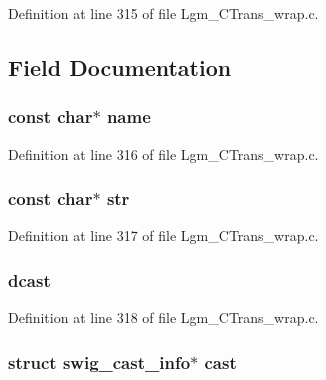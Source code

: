 Definition at line 315 of file Lgm\_\-CTrans\_\-wrap.c.

\subsection{Field Documentation}
\hypertarget{structswig__type__info_8f8f80d37794cde9472343e4487ba3eb}{
\subsubsection[{name}]{\setlength{\rightskip}{0pt plus 5cm}const char$\ast$ {\bf name}}}
\label{structswig__type__info_8f8f80d37794cde9472343e4487ba3eb}




Definition at line 316 of file Lgm\_\-CTrans\_\-wrap.c.\hypertarget{structswig__type__info_f25d6dc49269fa2003ac7c7fa6f13915}{
\subsubsection[{str}]{\setlength{\rightskip}{0pt plus 5cm}const char$\ast$ {\bf str}}}
\label{structswig__type__info_f25d6dc49269fa2003ac7c7fa6f13915}




Definition at line 317 of file Lgm\_\-CTrans\_\-wrap.c.\hypertarget{structswig__type__info_f97c463eb56e4061bd472750f8f501d3}{
\subsubsection[{dcast}]{ {\bf dcast}}}
\label{structswig__type__info_f97c463eb56e4061bd472750f8f501d3}




Definition at line 318 of file Lgm\_\-CTrans\_\-wrap.c.\hypertarget{structswig__type__info_ed90935b91e98b8de705d24f1b6facb0}{
\subsubsection[{cast}]{\setlength{\rightskip}{0pt plus 5cm}struct {\bf swig\_\-cast\_\-info}$\ast$ {\bf cast}}}
\label{structswig__type__info_ed90935b91e98b8de705d24f1b6facb0}




